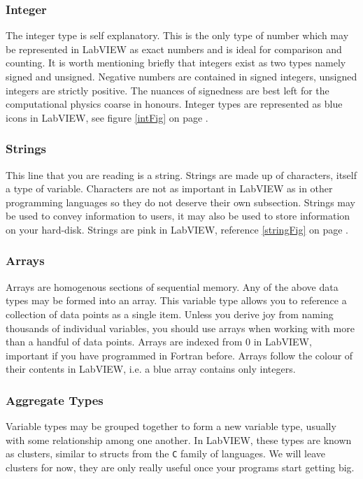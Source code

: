 	\subsubsection{Integer}
	The integer type is self explanatory. This is the only type of number which may be represented in LabVIEW as exact numbers and is ideal for comparison and counting. It is worth mentioning briefly that integers exist as two types namely signed and unsigned. Negative numbers are contained in signed integers, unsigned integers are strictly positive. The nuances of signedness are best left for the computational physics coarse in honours. Integer types are represented as blue icons in LabVIEW, see figure \ref{intFig} on page \pageref{intFig}.
	\subsubsection{Strings}
	This line that you are reading is a string. Strings are made up of characters, itself a type of variable. Characters are not as important in LabVIEW as in other programming languages so they do not deserve their own subsection. Strings may be used to convey information to users, it may also be used to store information on your hard-disk. Strings are pink in LabVIEW, reference \ref{stringFig} on page \pageref{stringFig}.
	\subsubsection{Arrays}
	Arrays are homogenous sections of sequential memory. Any of the above data types may be formed into an array. This variable type allows you to reference a collection of data points as a single item. Unless you derive joy from naming thousands of individual variables, you should use arrays when working with more than a handful of data points. Arrays are indexed from 0 in LabVIEW, important if you have programmed in Fortran before. Arrays follow the colour of their contents in LabVIEW, i.e. a blue array contains only integers.
	\subsubsection{Aggregate Types}
	Variable types may be grouped together to form a new variable type, usually with some relationship among one another. In LabVIEW, these types are known as clusters, similar to structs from the \texttt{C} family of languages. We will leave clusters for now, they are only really useful once your programs start getting big.\\
